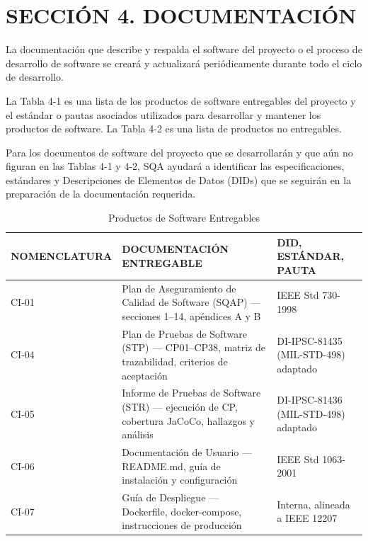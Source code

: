﻿\section{SECCIÓN 4. DOCUMENTACIÓN}
La documentación que describe y respalda el software del proyecto o el proceso de desarrollo de software se creará y actualizará periódicamente durante todo el ciclo de desarrollo.

La Tabla 4-1 es una lista de los productos de software entregables del proyecto y el estándar o pautas asociados utilizados para desarrollar y mantener los productos de software. La Tabla 4-2 es una lista de productos no entregables.

Para los documentos de software del proyecto que se desarrollarán y que aún no figuran en las Tablas 4-1 y 4-2, SQA ayudará a identificar las especificaciones, estándares y Descripciones de Elementos de Datos (DIDs) que se seguirán en la preparación de la documentación requerida.

\begin{table}[H]
\centering
\caption{Productos de Software Entregables}
\label{tab:deliverable}
\begin{tabular}{|p{4cm}|p{5.5cm}|p{5.5cm}|}
\hline
\textbf{NOMENCLATURA} & \textbf{DOCUMENTACIÓN ENTREGABLE} & \textbf{DID, ESTÁNDAR, PAUTA} \\
\hline
CI-01 & Plan de Aseguramiento de Calidad de Software (SQAP) --- secciones 1--14, apéndices A y B & IEEE Std 730-1998 \\
\hline
CI-04 & Plan de Pruebas de Software (STP) --- CP01--CP38, matriz de trazabilidad, criterios de aceptación & DI-IPSC-81435 (MIL-STD-498) adaptado \\
\hline
CI-05 & Informe de Pruebas de Software (STR) --- ejecución de CP, cobertura JaCoCo, hallazgos y análisis & DI-IPSC-81436 (MIL-STD-498) adaptado \\
\hline
CI-06 & Documentación de Usuario --- README.md, guía de instalación y configuración & IEEE Std 1063-2001 \\
\hline
CI-07 & Guía de Despliegue --- Dockerfile, docker-compose, instrucciones de producción & Interna, alineada a IEEE 12207 \\
\hline
\end{tabular}
\end{table}

